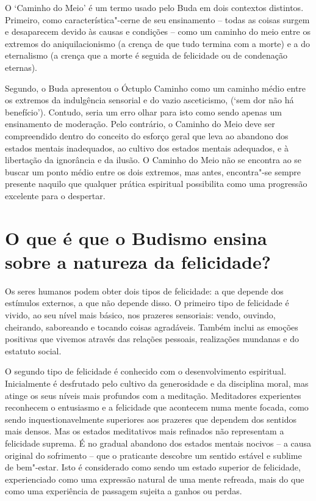 O `Caminho do Meio' é um termo usado pelo Buda em dois contextos
distintos. Primeiro, como característica"-cerne de seu ensinamento --
todas as coisas surgem e desaparecem devido às causas e condições --
como um caminho do meio entre os extremos do aniquilacionismo (a crença
de que tudo termina com a morte) e a do eternalismo (a crença que a
morte é seguida de felicidade ou de condenação eternas).

Segundo, o Buda apresentou o Óctuplo Caminho como um caminho médio entre
os extremos da indulgência sensorial e do vazio asceticismo, (`sem dor
não há benefício'). Contudo, seria um erro olhar para isto como sendo
apenas um ensinamento de moderação. Pelo contrário, o Caminho do Meio
deve ser compreendido dentro do conceito do esforço geral que leva ao
abandono dos estados mentais inadequados, ao cultivo dos estados mentais
adequados, e à libertação da ignorância e da ilusão. O Caminho do Meio
não se encontra ao se buscar um ponto médio entre os dois extremos, mas
antes, encontra"-se sempre presente naquilo que qualquer prática
espiritual possibilita como uma progressão excelente para o despertar.

\section{O que é que o Budismo ensina sobre a natureza da felicidade?}

Os seres humanos podem obter dois tipos de felicidade: a que depende dos
estímulos externos, a que não depende disso. O primeiro tipo de
felicidade é vivido, ao seu nível mais básico, nos prazeres sensoriais:
vendo, ouvindo, cheirando, saboreando e tocando coisas agradáveis.
Também inclui as emoções positivas que vivemos através das relações
pessoais, realizações mundanas e do estatuto social.

O segundo tipo de felicidade é conhecido com o desenvolvimento
espiritual. Inicialmente é desfrutado pelo cultivo da generosidade e da
disciplina moral, mas atinge os seus níveis mais profundos com a
meditação. Meditadores experientes reconhecem o entusiasmo e a
felicidade que acontecem numa mente focada, como sendo
inquestionavelmente superiores aos prazeres que dependem dos sentidos
mais densos. Mas os estados meditativos mais refinados não representam a
felicidade suprema. É no gradual abandono dos estados mentais nocivos --
a causa original do sofrimento -- que o praticante descobre um sentido
estável e sublime de bem"-estar. Isto é considerado como sendo um estado
superior de felicidade, experienciado como uma expressão natural de uma
mente refreada, mais do que como uma experiência de passagem sujeita a
ganhos ou perdas.

